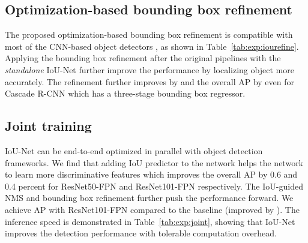 \documentclass[runningheads]{llncs}
\begin{document}
\subsection{Optimization-based bounding box refinement}
\label{sec:expr:refine}

\begin{table}[!t]
\centering
{}
\caption{The optimization-based bounding box refinement further improves the performance of several CNN-based object detectors.}
\label{tab:exp:iourefine}
\end{table}


The proposed optimization-based bounding box refinement is compatible with most of the CNN-based object detectors \cite{Lin_2017_CVPR,cai2017cascade,he2017mask}, as shown in Table~\ref{tab:exp:iourefine}. Applying the bounding box refinement after the original pipelines with the \emph{standalone} IoU-Net further improve the performance by localizing object more accurately. The refinement further improves  by  and the overall AP by  even for Cascade R-CNN which has a three-stage bounding box regressor.

\subsection{Joint training}


IoU-Net can be end-to-end optimized in parallel with object detection frameworks. We find that adding IoU predictor to the network helps the network to learn more discriminative features which improves the overall AP by 0.6 and 0.4 percent for ResNet50-FPN and ResNet101-FPN respectively. The IoU-guided NMS and bounding box refinement further push the performance forward. We achieve  AP with ResNet101-FPN compared to the baseline  (improved by ). The inference speed is demonstrated in Table~\ref{tab:exp:joint}, showing that IoU-Net improves the detection performance with tolerable computation overhead.
\end{document}
